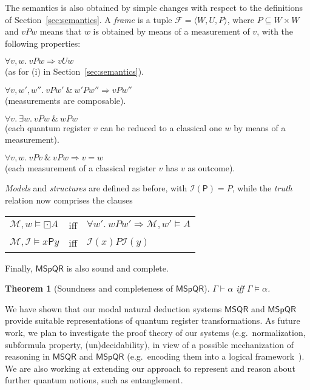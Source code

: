 \documentclass[times, 10pt]{article}
\newcommand{\MSQR}{\textsf{MSQR}}
\newcommand{\MSpQR}{\textsf{MSpQR}}
\newtheorem{theorem}{Theorem}
\newcommand{\PMe}{\mathsf{P}}
\newcommand{\I}{\mathscr{I}}
\begin{document}
The semantics is also obtained by simple changes with respect to the definitions of 
Section~\ref{sec:semantics}.
A \emph{frame} is a tuple $\mathscr{F} = \langle W, U, P\rangle$, where 
$P \subseteq W \times W$ and $v P w$ means that $w$ is obtained by means of a measurement of $v$, with the following properties:
\begin{en}
\item $\forall v, w.\ v P w \Longrightarrow v U w$ \\
(as for (i) in Section~\ref{sec:semantics}).
\item $\forall v, w',w''.\ v P w' \ \& \ w' P w''  \Longrightarrow v P w''$ \\
 (measurements are composable).
\item $\forall v.\ \exists w.\ v P w \ \& \ w P w$ \\
(each quantum register $v$ can be reduced to a classical one $w$ by means of a measurement).
\item $\forall v, w.\ v P v \ \& \ v P w \Longrightarrow v=w$ \\
(each measurement of a classical register $v$ has $v$ as outcome).
\end{en}
\emph{Models} and \emph{structures} are defined as before, with $\I(\PMe)=P$,
while the \emph{truth} relation now comprises the clauses
\begin{center}
\begin{tabular}{lll}
$\mathscr{M},w\vDash \boxdot A$ & iff & 
$\forall w'.\ w P w' \Longrightarrow \mathscr{M}, w'\vDash A$ \\
$\mathscr{M},\I\vDash x \PMe y$ & iff & $\I(x) P \I(y)$
\end{tabular}
\end{center}
Finally, $\MSpQR$ is also sound and complete.
\begin{theorem}[Soundness and completeness of $\MSpQR$]\label{theorem:soundness-completeness-MSpQR} 
$\Gamma \vdash \alpha$ iff $\Gamma \vDash \alpha$.
\end{theorem}


\label{sec:conclusions}

We have shown that our modal natural deduction systems $\MSQR$ and $\MSpQR$ 
provide suitable representations of quantum register transformations. As
future work, we plan to investigate the proof theory of our systems
(e.g.~normalization, subformula property, (un)decidability), in view
of a possible mechanization of reasoning in $\MSQR$ and $\MSpQR$ (e.g.~encoding 
them into a logical framework~\cite{Pfenning01}).  We are also working at extending 
our approach to represent and reason about further quantum notions, such as
entanglement.
\end{document}
